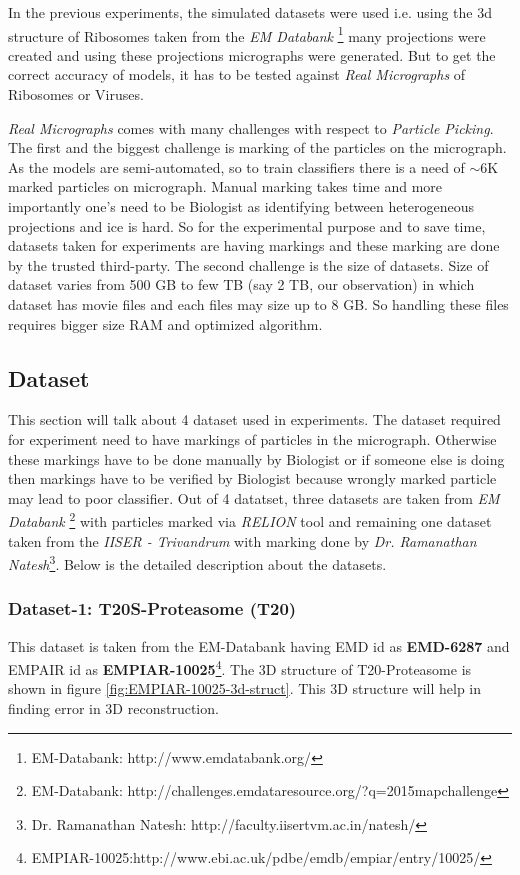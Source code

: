 \documentclass{report}
\begin{document}
In the previous experiments, the simulated datasets were used i.e. using the 3d structure of Ribosomes taken from the \textit{EM Databank} \footnote{\label{fn:emdatabank}EM-Databank: http://www.emdatabank.org/} many projections were created and using these projections micrographs were generated. But to get the correct accuracy of models, it has to be tested against \textit{Real Micrographs} of Ribosomes or Viruses. 

\textit{Real Micrographs} comes with many challenges with respect to \textit{Particle Picking}. The first and the biggest challenge is marking of the particles on the micrograph. As the models are semi-automated, so to train classifiers there is a need of $\sim$6K marked particles on micrograph. Manual marking takes time and more importantly one's need to be Biologist as identifying between heterogeneous projections and ice is hard. So for the experimental purpose and to save time, datasets taken for experiments are having markings and these marking are done by the trusted third-party. The second challenge is the size of datasets. Size of dataset varies from  500 GB to few TB (say 2 TB, our observation) in which dataset has movie files and each files may size up to 8 GB. So handling these files requires bigger size RAM and optimized algorithm.
\subsection{Dataset}
This section will talk about 4 dataset used in experiments. The dataset required for experiment need to have markings of particles in the micrograph. Otherwise these markings have to be done manually by Biologist or if someone else is doing then markings have to be verified by Biologist because wrongly marked particle may lead to poor classifier. Out of 4 datatset, three datasets are taken from \textit{EM Databank} \footnote{\label{fn:emdatabankchalange}EM-Databank: http://challenges.emdataresource.org/?q=2015\textunderscore map\textunderscore challenge} with particles marked via \textit{RELION} tool and remaining one dataset taken from the \textit{IISER - Trivandrum} with marking done by \textit{Dr. Ramanathan Natesh}\footnote{Dr. Ramanathan Natesh: http://faculty.iisertvm.ac.in/natesh/}. Below is the detailed description about the datasets.

\subsubsection{Dataset-1: T20S-Proteasome (T20)}\label{subsec:T20S-Proteasome}
This dataset is taken from the EM-Databank having EMD id as \textbf{EMD-6287} and EMPAIR id as \textbf{EMPIAR-10025}\footnote{\label{fn:EMPIAR-10025-3}EMPIAR-10025:http://www.ebi.ac.uk/pdbe/emdb/empiar/entry/10025/}. The 3D structure of T20-Proteasome is shown in figure \ref{fig:EMPIAR-10025-3d-struct}. This 3D structure will help in finding error in 3D reconstruction. 
\end{document}
